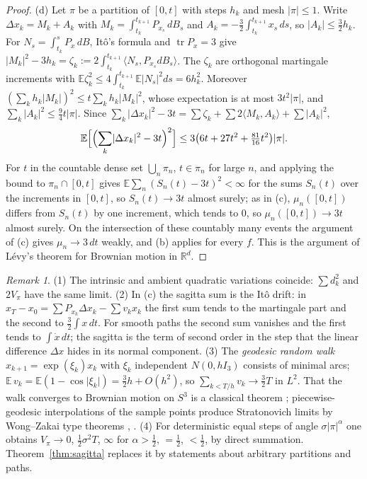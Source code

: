 \documentclass[11pt,reqno]{amsart}
\theoremstyle{definition}
\theoremstyle{remark}
\newtheorem{remark}[theorem]{Remark}
\numberwithin{equation}{section}
\newcommand{\R}{\mathbb{R}}
\newcommand{\ip}[2]{\langle #1,#2\rangle}
\begin{document}
\begin{proof}
(d) Let $\pi$ be a partition of $[0,t]$ with steps $h_k$ and mesh $\lvert\pi\rvert\le1$.  Write
$\Delta x_k=M_k+A_k$ with $M_k=\int_{t_k}^{t_{k+1}}P_{x_s}\,dB_s$ and $A_k=-\tfrac32\int_{t_k}^{t_{k+1}}x_s\,ds$, so
$\lvert A_k\rvert\le\tfrac32h_k$.  For $N_s=\int_{t_k}^sP_x\,dB$, It\^o's formula and $\operatorname{tr}P_x=3$ give
$\lvert M_k\rvert^2-3h_k=\zeta_k:=2\int_{t_k}^{t_{k+1}}\ip{N_s}{P_{x_s}dB_s}$.  The $\zeta_k$ are orthogonal martingale increments
with $\mathbb E\zeta_k^2\le4\int_{t_k}^{t_{k+1}}\mathbb E\lvert N_s\rvert^2ds=6h_k^2$.  Moreover
$(\sum_kh_k\lvert M_k\rvert)^2\le t\sum_kh_k\lvert M_k\rvert^2$, whose expectation is at most $3t^2\lvert\pi\rvert$, and
$\sum_k\lvert A_k\rvert^2\le\tfrac94t\lvert\pi\rvert$.  Since
$\sum_k\lvert\Delta x_k\rvert^2-3t=\sum\zeta_k+\sum2\ip{M_k}{A_k}+\sum\lvert A_k\rvert^2$,
\[
\mathbb E\Bigl[\Bigl(\sum_k\lvert\Delta x_k\rvert^2-3t\Bigr)^2\Bigr]\le3\bigl(6t+27t^2+\tfrac{81}{16}t^2\bigr)\lvert\pi\rvert .
\]
For $t$ in the countable dense set $\bigcup_n\pi_n$, $t\in\pi_n$ for large $n$, and applying the bound to $\pi_n\cap[0,t]$ gives
$\mathbb E\sum_n(S_n(t)-3t)^2<\infty$ for the sums $S_n(t)$ over the increments in $[0,t]$, so $S_n(t)\to3t$ almost surely; as in
(c), $\mu_n([0,t])$ differs from $S_n(t)$ by one increment, which tends to $0$, so $\mu_n([0,t])\to3t$ almost surely.  On the intersection of these countably many
events the argument of (c) gives $\mu_n\to3\,dt$ weakly, and (b) applies for every $f$.  This is the argument of L\'evy's
theorem for Brownian motion in $\R^d$.
\end{proof}

\begin{remark}
(1) The intrinsic and ambient quadratic variations coincide: $\sum d_k^2$ and $2V_\pi$ have the same limit.
(2) In (c) the sagitta sum is the It\^o drift: in $x_T-x_0=\sum P_{x_k}\Delta x_k-\sum v_kx_k$ the first sum
tends to the martingale part and the second to $\tfrac32\int x\,dt$.  For smooth paths the second sum
vanishes and the first tends to $\int\dot x\,dt$; the sagitta is the term of second order in the step
that the linear difference $\Delta x$ hides in its normal component.
(3) The \emph{geodesic random walk} $x_{k+1}=\exp(\xi_k)x_k$ with $\xi_k$ independent $N(0,hI_3)$ consists of
minimal arcs; $\mathbb E\,v_k=\mathbb E(1-\cos\lvert\xi_k\rvert)=\tfrac32h+O(h^2)$, so $\sum_{k<T/h}v_k\to\tfrac32T$
in $L^2$.  That the walk converges to Brownian motion on $S^3$ is a classical theorem
\cite{Jorgensen}; piecewise-geodesic interpolations of the sample points produce Stratonovich limits by
Wong--Zakai type theorems \cite{WZ}, \cite[Ch.~VI]{IW}.
(4) For deterministic equal steps of angle $\sigma\lvert\pi\rvert^\alpha$ one obtains $V_\pi\to0$,
$\tfrac12\sigma^2T$, $\infty$ for $\alpha>\tfrac12$, $=\tfrac12$, $<\tfrac12$, by direct summation.  Theorem~\ref{thm:sagitta} replaces it by statements about arbitrary partitions and paths.
\end{remark}
\end{document}
